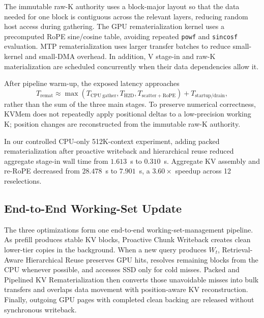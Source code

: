 The immutable raw-K authority uses a block-major layout so that the data needed
for one block is contiguous across the relevant layers, reducing random host
access during gathering.  The GPU rematerialization kernel uses a precomputed
RoPE sine/cosine table, avoiding repeated \texttt{powf} and \texttt{sincosf}
evaluation.  MTP rematerialization uses larger transfer batches to reduce
small-kernel and small-DMA overhead.  In addition, V stage-in and raw-K
materialization are scheduled concurrently when their data dependencies allow
it.

After pipeline warm-up, the exposed latency approaches
\begin{equation}
  T_{\mathrm{remat}} \approx
  \max\!\left(
    T_{\mathrm{CPU\ gather}},
    T_{\mathrm{H2D}},
    T_{\mathrm{scatter+RoPE}}
  \right)
  + T_{\mathrm{startup/drain}},
  \label{eq:pipelined-rematerialization-time}
\end{equation}
rather than the sum of the three main stages.  To preserve numerical
correctness, KVMem does not repeatedly apply positional deltas to a
low-precision working K; position changes are reconstructed from the
immutable raw-K authority.

In our controlled CPU-only 512K-context experiment, adding packed
rematerialization after proactive writeback and hierarchical reuse reduced
aggregate stage-in wall time from \(1.613\)~s to \(0.310\)~s.  Aggregate KV
assembly and re-RoPE decreased from \(28.478\)~s to \(7.901\)~s, a
\(3.60\times\) speedup across 12 reselections.

\subsection{End-to-End Working-Set Update}
\label{sec:end-to-end-working-set-update}

The three optimizations form one end-to-end working-set-management pipeline.
As prefill produces stable KV blocks, Proactive Chunk Writeback creates clean
lower-tier copies in the background.  When a new query produces \(W_t\),
Retrieval-Aware Hierarchical Reuse preserves GPU hits, resolves remaining
blocks from the CPU whenever possible, and accesses SSD only for cold misses.
Packed and Pipelined KV Rematerialization then converts those unavoidable
misses into bulk transfers and overlaps data movement with position-aware KV
reconstruction.  Finally, outgoing GPU pages with completed clean backing are
released without synchronous writeback.

